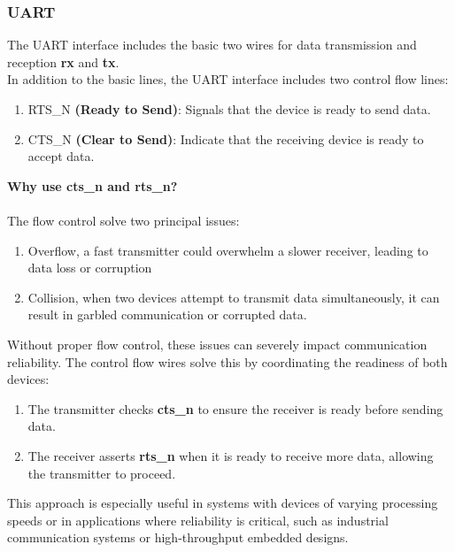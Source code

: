 \documentclass[12pt]{article}
\begin{document}
\subsubsection{UART}
The UART interface includes the basic two wires for data transmission and reception
\textbf{rx} and \textbf{tx}.\\
In addition to the basic lines, the UART interface includes two control flow lines:
\begin{enumerate}
  \item RTS\_N \textbf{(Ready to Send)}: Signals that the device is ready to send data.
  \item CTS\_N \textbf{(Clear to Send)}: Indicate that the receiving device is ready 
        to accept data.
\end{enumerate}
\textbf{Why use cts\_n and rts\_n?}\\~\\
The flow control solve two principal issues:
\begin{enumerate}
  \item Overflow, a fast transmitter could overwhelm a slower receiver, leading to 
        data loss or corruption
  \item Collision, when two devices attempt to transmit data simultaneously, it can 
        result in garbled communication or corrupted data.
\end{enumerate}
Without proper flow control, these issues can severely impact communication reliability.
The control flow wires solve this by coordinating the readiness of both devices:
\begin{enumerate}
  \item The transmitter checks \textbf{cts\_n} to ensure the receiver is ready before sending 
        data.
  \item The receiver asserts \textbf{rts\_n} when it is ready to receive more data, allowing 
        the transmitter to proceed.
\end{enumerate}
This approach is especially useful in systems with devices of varying processing
speeds or in applications where reliability is critical, such as industrial 
communication systems or high-throughput embedded designs.
\end{document}
